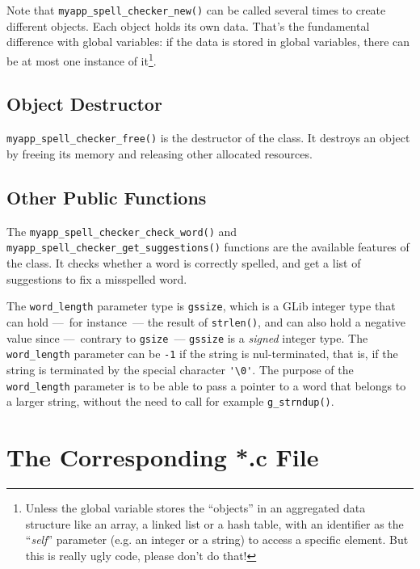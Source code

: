 Note that \lstinline{myapp_spell_checker_new()} can be called several times to create different objects. Each object holds its own data. That's the fundamental difference with global variables: if the data is stored in global variables, there can be at most one instance of it\footnote{Unless the global variable stores the ``objects'' in an aggregated data structure like an array, a linked list or a hash table, with an identifier as the ``\emph{self}'' parameter (e.g. an integer or a string) to access a specific element. But this is really ugly code, please don't do that!}.


\subsection{Object Destructor}
\lstinline{myapp_spell_checker_free()} is the destructor of the class. It destroys an object by freeing its memory and releasing other allocated resources.

\subsection{Other Public Functions}
The \lstinline{myapp_spell_checker_check_word()} and \lstinline{myapp_spell_checker_get_suggestions()} functions are the available features of the class. It checks whether a word is correctly spelled, and get a list of suggestions to fix a misspelled word.

The \lstinline{word_length} parameter type is \lstinline{gssize}, which is a GLib integer type that can hold ---~for instance~--- the result of \lstinline{strlen()}, and can also hold a negative value since ---~contrary to \lstinline{gsize}~--- \lstinline{gssize} is a \emph{signed} integer type. The \lstinline{word_length} parameter can be \lstinline{-1} if the string is nul-terminated, that is, if the string is terminated by the special character \lstinline{'\0'}. The purpose of the \lstinline{word_length} parameter is to be able to pass a pointer to a word that belongs to a larger string, without the need to call for example \lstinline{g_strndup()}.

\section{The Corresponding *.c File}


